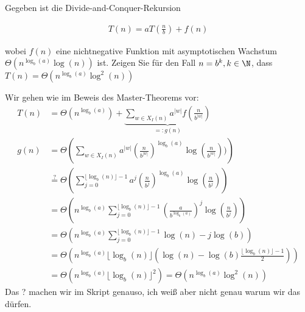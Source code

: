 
\begin{exercise}

Gegeben ist die Divide-and-Conquer-Rekursion

\begin{align*}
  T(n) = aT\left(\frac{n}{b}\right) + f(n)
\end{align*}

wobei $f(n)$ eine nichtnegative Funktion mit asymptotischen Wachstum $\Theta(n^{\log_b(a)}\log (n))$ ist. Zeigen Sie für den Fall $n = b^k, k \in \N$, dass $T(n) = \Theta(n^{\log_b(a)}\log^2 (n))$

\end{exercise}


\begin{solution}
Wir gehen wie im Beweis des Master-Theorems vor:
\begin{align*}
  T(n) &= \Theta\left(n^{\log_b(a)}\right) +
  \underbrace{\sum_{w \in X_I(n)}a^{|w|}f\left(\frac{n}{b^{|w|}}\right)}_{=: g(n)} \\
  g(n) &= \Theta\left(\sum_{w \in X_I(n)}a^{|w|}
  \left(\frac{n}{b^{|w|}}\right)^{\log_b(a)}\log \left(\frac{n}{b^{|w|}}\right))\right) \\
  &\stackrel{?}{=} \Theta\left(\sum_{j = 0}^{\lfloor \log_b(n) \rfloor -1}a^{j}
  \left(\frac{n}{b^{j}}\right)^{\log_b(a)}\log \left(\frac{n}{b^{j}}\right)\right) \\
  &= \Theta\left(n^{\log_b(a)}\sum_{j = 0}^{\lfloor \log_b(n) \rfloor -1}
  \left(\frac{a}{b^{\log_b(a)}}\right)^j \log \left(\frac{n}{b^{j}}\right)\right) \\
  &= \Theta\left(n^{\log_b(a)}\sum_{j = 0}^{\lfloor \log_b(n) \rfloor -1}
  \log(n) - j\log(b)\right) \\
  &= \Theta\left(n^{\log_b(a)}\lfloor \log_b(n) \rfloor\left(\log(n) -
  \log(b)\frac{\lfloor \log_b(n) \rfloor -1}{2}\right)\right) \\
  &= \Theta\left(n^{\log_b(a)}\lfloor \log_b(n) \rfloor^2\right)
  =  \Theta\left(n^{\log_b(a)}\log^2(n)\right)
\end{align*}
Das ? machen wir im Skript genauso, ich weiß aber nicht genau warum wir das dürfen.
\end{solution}

